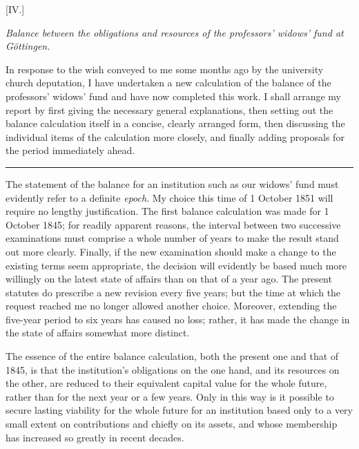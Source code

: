 \begin{center}
[IV.]\par\medskip
\textit{Balance between the obligations and resources of the professors' widows' fund at Göttingen.}
\end{center}
\noindent\hspace*{\parindent}In response to the wish conveyed to me some months ago by the university church deputation, I have undertaken a new calculation of the balance of the professors' widows' fund and have now completed this work. I shall arrange my report by first giving the necessary general explanations, then setting out the balance calculation itself in a concise, clearly arranged form, then discussing the individual items of the calculation more closely, and finally adding proposals for the period immediately ahead.
\begin{center}\rule{.26\textwidth}{.3pt}\end{center}
\noindent\hspace*{\parindent}The statement of the balance for an institution such as our widows' fund must evidently refer to a definite \textit{epoch}. My choice this time of 1 October 1851 will require no lengthy justification. The first balance calculation was made for 1 October 1845; for readily apparent reasons, the interval between two successive examinations must comprise a whole number of years to make the result stand out more clearly. Finally, if the new examination should make a change to the existing terms seem appropriate, the decision will evidently be based much more willingly on the latest state of affairs than on that of a year ago. The present statutes do prescribe a new revision every five years; but the time at which the request reached me no longer allowed another choice. Moreover, extending the five-year period to six years has caused no loss; rather, it has made the change in the state of affairs somewhat more distinct.

The essence of the entire balance calculation, both the present one and that of 1845, is that the institution's obligations on the one hand, and its resources on the other, are reduced to their equivalent capital value for the whole future, rather than for the next year or a few years. Only in this way is it possible to secure lasting viability for the whole future for an institution based only to a very small extent on contributions and chiefly on its assets, and whose membership has increased so greatly in recent decades.

